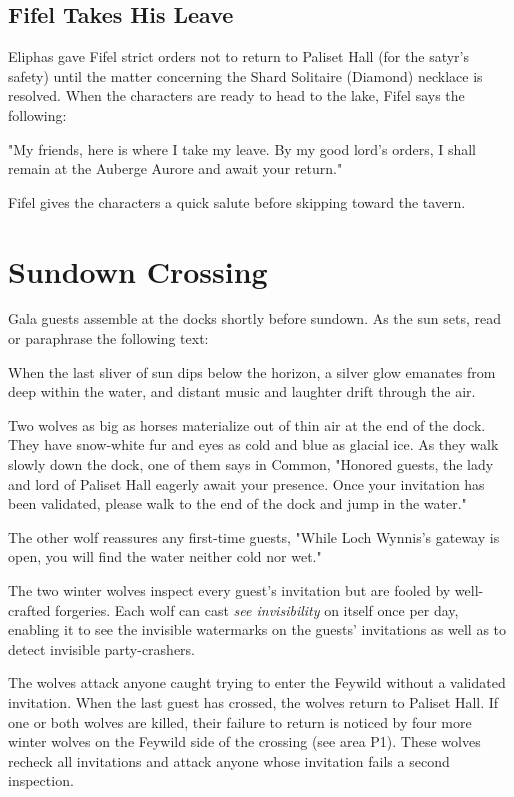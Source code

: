 \documentclass[10pt,a4paper,twoside,bg=print,twocolumn,openany,nodeprecatedcode]{dndbook}
\begin{document}
\subsection{Fifel Takes His Leave}
Eliphas gave Fifel strict orders not to return to Paliset Hall (for the satyr's safety) until the matter concerning the Shard Solitaire (Diamond) necklace is resolved. When the characters are ready to head to the lake, Fifel says the following:

\begin{DndReadAloud}{}
"My friends, here is where I take my leave. By my good lord's orders, I shall remain at the Auberge Aurore and await your return."

\end{DndReadAloud}

Fifel gives the characters a quick salute before skipping toward the tavern.

\section{Sundown Crossing}
Gala guests assemble at the docks shortly before sundown. As the sun sets, read or paraphrase the following text:

\begin{DndReadAloud}{}
When the last sliver of sun dips below the horizon, a silver glow emanates from deep within the water, and distant music and laughter drift through the air.

Two wolves as big as horses materialize out of thin air at the end of the dock. They have snow-white fur and eyes as cold and blue as glacial ice. As they walk slowly down the dock, one of them says in Common, "Honored guests, the lady and lord of Paliset Hall eagerly await your presence. Once your invitation has been validated, please walk to the end of the dock and jump in the water."

The other wolf reassures any first-time guests, "While Loch Wynnis's gateway is open, you will find the water neither cold nor wet."

\end{DndReadAloud}

The two winter wolves inspect every guest's invitation but are fooled by well-crafted forgeries. Each wolf can cast \textit{see invisibility} on itself once per day, enabling it to see the invisible watermarks on the guests' invitations as well as to detect invisible party-crashers.

The wolves attack anyone caught trying to enter the Feywild without a validated invitation. When the last guest has crossed, the wolves return to Paliset Hall. If one or both wolves are killed, their failure to return is noticed by four more winter wolves on the Feywild side of the crossing (see area P1). These wolves recheck all invitations and attack anyone whose invitation fails a second inspection.
\end{document}
